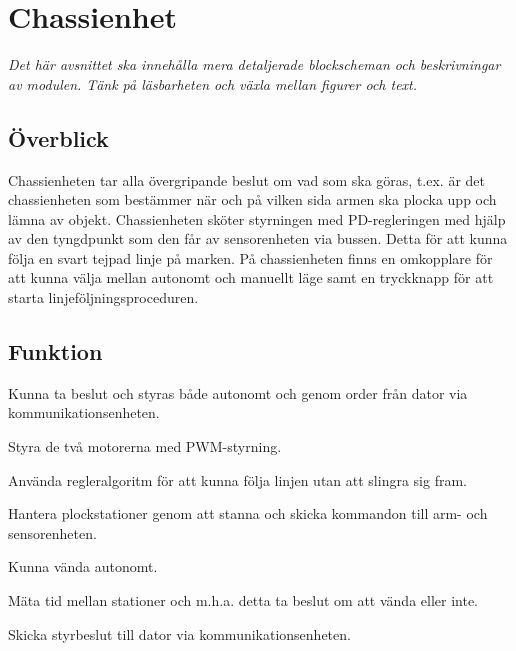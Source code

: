 \section{Chassienhet}
\emph{Det här avsnittet ska innehålla mera detaljerade blockscheman och beskrivningar av modulen.
Tänk på läsbarheten och växla mellan figurer och text.}

\subsection{Överblick}
Chassienheten tar alla övergripande beslut om vad som ska göras, t.ex. är det chassienheten som bestämmer när och på vilken sida armen ska plocka upp och lämna av objekt. Chassienheten sköter styrningen med PD-regleringen med hjälp av den tyngdpunkt som den får av sensorenheten via bussen. Detta för att kunna följa en svart tejpad linje på marken. På chassienheten finns en omkopplare för att kunna välja mellan autonomt och manuellt läge samt en tryckknapp för att starta linjeföljningsproceduren. 

\subsection{Funktion}

\begin{packed_itemize}
\item Kunna ta beslut och styras både autonomt och genom order från dator via kommunikationsenheten.
\item Styra de två motorerna med PWM-styrning.
\item Använda regleralgoritm för att kunna följa linjen utan att slingra sig fram.
\item Hantera plockstationer genom att stanna och skicka kommandon till arm- och sensorenheten.
\item Kunna vända autonomt.
\item Mäta tid mellan stationer och m.h.a. detta ta beslut om att vända eller inte.
\item Skicka styrbeslut till dator via kommunikationsenheten.
\end{packed_itemize}